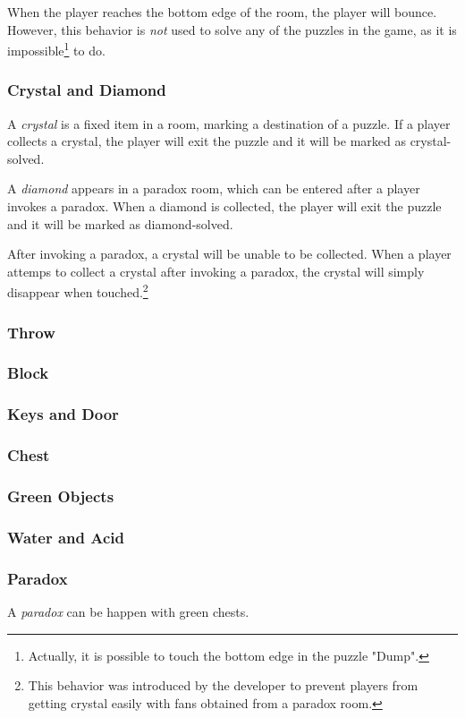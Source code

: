 \documentclass[a4paper]{article}
\theoremstyle{definition}
\begin{document}
When the player reaches the bottom edge of the room, the player will bounce.
However, this behavior is \emph{not} used to solve any of the puzzles in the game,
as it is impossible\footnote{Actually, it is possible to touch the bottom edge in the puzzle "Dump".} to do.
\subsubsection{Crystal and Diamond}
A \emph{crystal} is a fixed item in a room, marking a destination of a puzzle. If a player
collects a crystal, the player will exit the puzzle and it will be marked as crystal-solved.

A \emph{diamond} appears in a paradox room, which can be entered after a player invokes a paradox.
When a diamond is collected, the player will exit the puzzle and it will be marked as diamond-solved.

After invoking a paradox, a crystal will be unable to be collected. When a player attemps to collect a crystal
after invoking a paradox, the crystal will simply disappear when touched.\footnote{This behavior was introduced
by the developer to prevent players from getting crystal easily with fans obtained from a paradox room.}
\subsubsection{Throw}
\subsubsection{Block}
\subsubsection{Keys and Door}
\subsubsection{Chest}
\subsubsection{Green Objects}
\subsubsection{Water and Acid}
\subsubsection{Paradox}
A \emph{paradox} can be happen with green chests.
\end{document}
